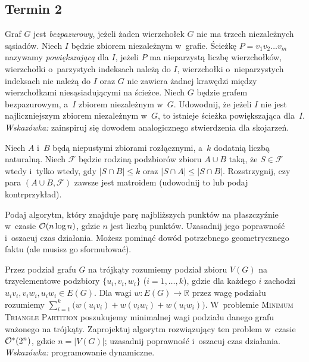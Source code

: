 \subsection{Termin 2}

\begin{zadanie}
	Graf $G$ jest \emph{bezpazurowy}, jeżeli żaden wierzchołek $G$ nie ma trzech
	niezależnych sąsiadów. Niech $I$ będzie zbiorem niezależnym w~grafie. Ścieżkę
	$P=v_1v_2\dots v_m$ nazywamy \emph{powiększającą} dla $I$, jeżeli $P$ ma
	nieparzystą liczbę wierzchołków, wierzchołki o~parzystych indeksach należą do
	$I$, wierzchołki o~nieparzystych indeksach nie należą do $I$ oraz $G$ nie
	zawiera żadnej krawędzi między wierzchołkami niesąsiadującymi na ścieżce. Niech
	$G$ będzie grafem bezpazurowym, a~$I$ zbiorem niezależnym w~$G$. Udowodnij, że
	jeżeli $I$ nie jest najliczniejszym zbiorem niezależnym w~$G$, to istnieje
	ścieżka powiększająca dla~$I$. \emph{Wskazówka:} zainspiruj się dowodem
	analogicznego stwierdzenia dla skojarzeń.
\end{zadanie}

\begin{zadanie}
	Niech $A$ i~$B$ będą niepustymi zbiorami rozłącznymi, a~$k$ dodatnią liczbą
	naturalną. Niech $\mathcal{F}$ będzie rodziną podzbiorów zbioru $A\cup B$ taką,
	że $S\in\mathcal{F}$ wtedy i~tylko wtedy, gdy $|S\cap B|\le k$ oraz
	$|S\cap A|\le|S\cap B|$. Rozstrzygnij, czy para $(A\cup B,\mathcal{F})$ zawsze
	jest matroidem (udowodnij to lub podaj kontrprzykład).
\end{zadanie}

\begin{zadanie}
	Podaj algorytm, który znajduje parę najbliższych punktów na płaszczyźnie
	w~czasie $\mathcal{O}(n\log n)$, gdzie $n$ jest liczbą punktów. Uzasadnij jego
	poprawność i~oszacuj czas działania. Możesz pominąć dowód potrzebnego
	geometrycznego faktu (ale musisz go sformułować).
\end{zadanie}

\begin{zadanie}
	Przez podział grafu $G$ na trójkąty rozumiemy podział zbioru $V(G)$ na
	trzyelementowe podzbiory $\{u_i,v_i,w_i\}$ ($i=1,\dots,k$), gdzie dla każdego
	$i$ zachodzi $u_iv_i,v_iw_i,u_iw_i\in E(G)$. Dla wagi $w:E(G)\to\mathbb{R}$
	przez wagę podziału rozumiemy $\sum_{i=1}^k\big(w(u_iv_i)+w(v_iw_i)+w(u_iw_i)\big)$.
	W~problemie \textsc{Minimum Triangle Partition} poszukujemy minimalnej wagi
	podziału danego grafu ważonego na trójkąty. Zaprojektuj algorytm rozwiązujący
	ten problem w~czasie $\mathcal{O}^*(2^n)$, gdzie $n=|V(G)|$; uzasadnij poprawność
	i~oszacuj czas działania. \emph{Wskazówka:} programowanie dynamiczne.
\end{zadanie}

